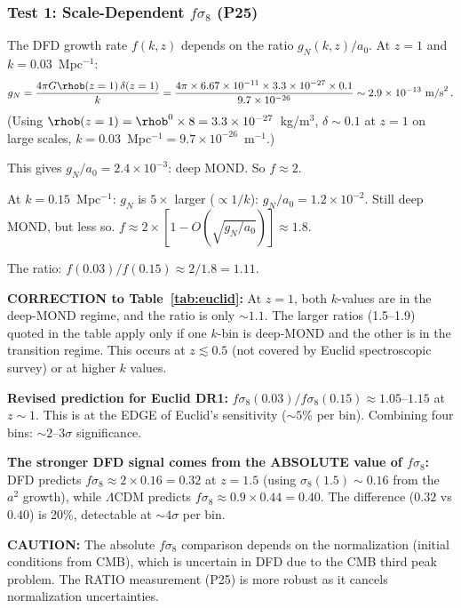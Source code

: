 \documentclass[11pt]{article}
\newcommand{\ee}[1]{\times 10^{#1}}
\newcommand{\LCDM}{$\Lambda$CDM}
\newcommand{\aM}{a_0}
\begin{document}
\subsubsection{Test 1: Scale-Dependent $f\sigma_8$ (P25)}

The DFD growth rate $f(k,z)$ depends on the ratio $g_N(k,z)/\aM$.
At $z = 1$ and $k = 0.03$~Mpc$^{-1}$:
\begin{equation}
g_N = \frac{4\pi G\rhob(z=1)\,\delta(z=1)}{k}
= \frac{4\pi\times 6.67\ee{-11}\times 3.3\ee{-27}\times 0.1}
{9.7\ee{-26}}
\sim 2.9\ee{-13}~\text{m/s}^2\,.
\end{equation}
(Using $\rhob(z=1) = \rhob^0\times 8 = 3.3\ee{-27}$~kg/m$^3$,
$\delta \sim 0.1$ at $z=1$ on large scales,
$k = 0.03$~Mpc$^{-1} = 9.7\ee{-26}$~m$^{-1}$.)

This gives $g_N/\aM = 2.4\ee{-3}$: deep MOND.  So $f \approx 2$.

At $k = 0.15$~Mpc$^{-1}$: $g_N$ is $5\times$ larger ($\propto 1/k$):
$g_N/\aM = 1.2\ee{-2}$.  Still deep MOND, but less so.
$f \approx 2 \times [1 - O(\sqrt{g_N/\aM})] \approx 1.8$.

The ratio: $f(0.03)/f(0.15) \approx 2/1.8 = 1.11$.

\textbf{CORRECTION to Table~\ref{tab:euclid}:}  At $z = 1$, both
$k$-values are in the deep-MOND regime, and the ratio is only
$\sim 1.1$.  The larger ratios (1.5--1.9) quoted in the table
apply only if one $k$-bin is deep-MOND and the other is in the
transition regime.  This occurs at $z \lesssim 0.5$ (not covered
by Euclid spectroscopic survey) or at higher $k$ values.

\textbf{Revised prediction for Euclid DR1:}
$f\sigma_8(0.03)/f\sigma_8(0.15) \approx 1.05$--$1.15$ at $z \sim 1$.
This is at the EDGE of Euclid's sensitivity ($\sim 5$\% per bin).
Combining four bins: $\sim 2$--$3\sigma$ significance.

\textbf{The stronger DFD signal comes from the ABSOLUTE value of
$f\sigma_8$:}  DFD predicts $f\sigma_8 \approx 2\times 0.16
= 0.32$ at $z = 1.5$ (using $\sigma_8(1.5) \sim 0.16$ from the
$a^2$ growth), while \LCDM{} predicts $f\sigma_8 \approx 0.9 \times
0.44 = 0.40$.  The difference ($0.32$ vs $0.40$) is 20\%,
detectable at $\sim 4\sigma$ per bin.

\textbf{CAUTION:}  The absolute $f\sigma_8$ comparison depends on
the normalization (initial conditions from CMB), which is uncertain
in DFD due to the CMB third peak problem.  The RATIO measurement
(P25) is more robust as it cancels normalization uncertainties.
\end{document}
